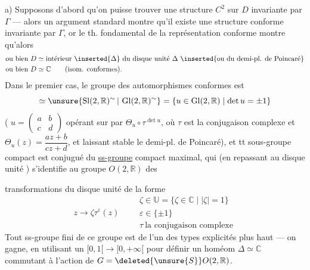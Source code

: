 




 a) Supposons d'abord qu'on puisse trouver une structure $C^2$ sur $D$ invariante par $\Gamma$ --- alors un argument standard montre qu'il existe une structure conforme invariante par $\Gamma$, or le th. fondamental de la représentation conforme montre qu'alors
\[
\begin{aligned}
&\text{ou bien }D\simeq\text{intérieur}\ \inserted{\Delta}\ \text{du disque unité }\Delta\ \inserted{\text{ou du demi-pl. de Poincaré}}\\
&\text{ou bien }D\simeq\mathbb C\qquad\text{(isom. conformes).}
\end{aligned}
\]
Dans le premier cas, le groupe des automorphismes  conformes est
\[
\simeq\unsure{\operatorname{Sl}(2,\mathbb R)^\sim\,|\,\operatorname{Gl}(2,\mathbb R)^\sim}
=\{u\in\operatorname{Gl}(2,\mathbb R)\mid\det u=\pm1\}
\]
( $u=\left(\begin{smallmatrix}a&b\\c&d\end{smallmatrix}\right)$ opérant sur   par  $\Theta_u\circ\tau^{\det u}$, où $\tau$ est la conjugaison complexe et $\Theta_u(z)=\dfrac{az+b}{cz+d}$, et laissant stable le demi-pl. de Poincaré), et tt sous-groupe compact est  conjugué du \uline{ss-groupe} compact maximal, qui (en repassant au disque unité \inserted{$\Delta$}) s'identifie au groupe $O(2,\mathbb R)$ des


transformations du disque unité de la forme
\[
z\longrightarrow\zeta\tau^\varepsilon(z)\qquad
\begin{gathered}
\zeta\in\mathbb U=\{\zeta\in\mathbb C\mid |\zeta|=1\}\\
\varepsilon\in\{\pm1\}\\
\tau\ \text{la conjugaison complexe}
\end{gathered}
\]
Tout ss-groupe fini de ce groupe est de l'un des types explicités plus haut --- on gagne, en utilisant un  $[0,1[\longrightarrow[0,+\infty[$ pour définir un homéom  $\Delta\simeq\mathbb C$ commutant à l'action de $G=\deleted{\unsure{S}}O(2,\mathbb R)$.

